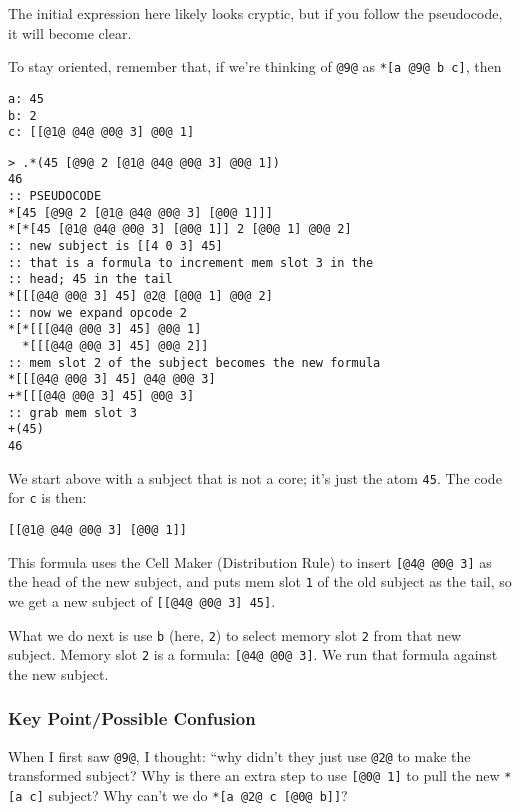 \documentclass[twoside]{article}
\begin{document}
The initial expression here likely looks cryptic, but if you follow the pseudocode, it will become clear.

To stay oriented, remember that, if we're thinking of \lstinline[style=inlinecode]{@9@} as \lstinline[style=inlinecode]{*[a @9@ b c]}, then

\begin{lstlisting}[style=listingcode]
a: 45
b: 2
c: [[@1@ @4@ @0@ 3] @0@ 1]
\end{lstlisting}

\begin{lstlisting}[style=listingcode]
> .*(45 [@9@ 2 [@1@ @4@ @0@ 3] @0@ 1])
46
:: PSEUDOCODE
*[45 [@9@ 2 [@1@ @4@ @0@ 3] [@0@ 1]]]
*[*[45 [@1@ @4@ @0@ 3] [@0@ 1]] 2 [@0@ 1] @0@ 2]
:: new subject is [[4 0 3] 45]
:: that is a formula to increment mem slot 3 in the
:: head; 45 in the tail
*[[[@4@ @0@ 3] 45] @2@ [@0@ 1] @0@ 2]
:: now we expand opcode 2
*[*[[[@4@ @0@ 3] 45] @0@ 1]
  *[[[@4@ @0@ 3] 45] @0@ 2]]
:: mem slot 2 of the subject becomes the new formula
*[[[@4@ @0@ 3] 45] @4@ @0@ 3]
+*[[[@4@ @0@ 3] 45] @0@ 3]
:: grab mem slot 3
+(45)
46
\end{lstlisting}

We start above with a subject that is not a core; it's just the atom \lstinline[style=inlinecode]{45}. The code for \lstinline[style=inlinecode]{c} is then:

\begin{lstlisting}[style=listingcode]
[[@1@ @4@ @0@ 3] [@0@ 1]]
\end{lstlisting}

This formula uses the Cell Maker (Distribution Rule) to insert \lstinline[style=inlinecode]{[@4@ @0@ 3]} as the head of the new subject, and puts mem slot \lstinline[style=inlinecode]{1} of the old subject as the tail, so we get a new subject of \lstinline[style=inlinecode]{[[@4@ @0@ 3] 45]}.

What we do next is use \lstinline[style=inlinecode]{b} (here, \lstinline[style=inlinecode]{2}) to select memory slot \lstinline[style=inlinecode]{2} from that new subject. Memory slot \lstinline[style=inlinecode]{2} is a formula: \lstinline[style=inlinecode]{[@4@ @0@ 3]}. We run that formula against the new subject.

\subsubsection{Key Point/Possible Confusion}

When I first saw \lstinline[style=inlinecode]{@9@}, I thought: ``why didn't they just use \lstinline[style=inlinecode]{@2@} to make the transformed subject? Why is there an extra step to use \lstinline[style=inlinecode]{[@0@ 1]} to pull the new \lstinline[style=inlinecode]{*[a c]} subject? Why can't we do \lstinline[style=inlinecode]{*[a @2@ c [@0@ b]]}?
\end{document}
